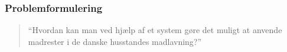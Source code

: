 \begin{frame}
\frametitle{Problemformulering}

	\begin{quote}
		``Hvordan kan man ved hjælp af et system gøre det muligt at
		 anvende madrester i de danske husstandes madlavning?''
	\end{quote}

\end{frame}
